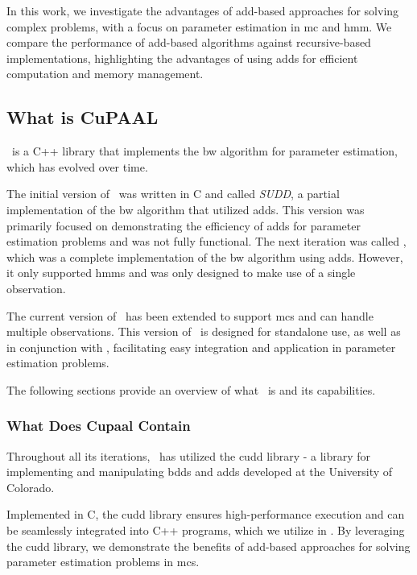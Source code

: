 In this work, we investigate the advantages of \gls{add}-based approaches for solving complex problems, with a focus on parameter estimation in \gls{mc} and \gls{hmm}. We compare the performance of \gls{add}-based algorithms against recursive-based implementations, highlighting the advantages of using \glspl{add} for efficient computation and memory management.

\subsection{What is CuPAAL}\label{subsec:what_is_cupaal}
\Cupaal\ is a C++ library that implements the \gls{bw} algorithm for parameter estimation, which has evolved over time.

The initial version of \Cupaal\ was written in C and called \textit{SUDD}, a partial implementation of the \gls{bw} algorithm that utilized \glspl{add}. This version was primarily focused on demonstrating the efficiency of \glspl{add} for parameter estimation problems and was not fully functional. The next iteration was called \Cupaal, which was a complete implementation of the \gls{bw} algorithm using \glspl{add}. However, it only supported \glspl{hmm} and was only designed to make use of a single observation.

The current version of \Cupaal\ has been extended to support \glspl{mc} and can handle multiple observations. This version of \Cupaal\ is designed for standalone use, as well as in conjunction with \Jajapy, facilitating easy integration and application in parameter estimation problems.

The following sections provide an overview of what \Cupaal\ is and its capabilities.

\subsubsection{What Does Cupaal Contain}\label{subsec:what_does_cupaal_contain}
Throughout all its iterations, \Cupaal\ has utilized the \gls{cudd} library - a library for implementing and manipulating \glspl{bdd} and \glspl{add} developed at the University of Colorado.

Implemented in C, the \gls{cudd} library ensures high-performance execution and can be seamlessly integrated into C++ programs, which we utilize in \Cupaal.
By leveraging the \gls{cudd} library, we demonstrate the benefits of \gls{add}-based approaches for solving parameter estimation problems in \glspl{mc}.

